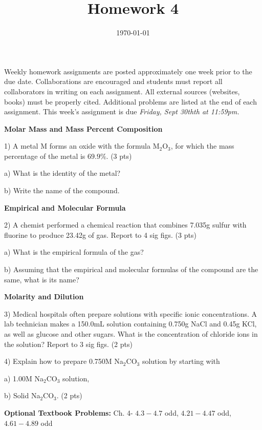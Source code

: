 \documentclass[12pt]{article}
\title{\textbf{Homework 4}}
\date{\vspace{-2em}\today}
\begin{document}
\maketitle 

Weekly homework assignments are posted approximately one week prior to the
due date. Collaborations are encouraged and students must report all collaborators
in writing on each assignment. All external sources (websites, books) must be
properly cited. Additional problems are listed at the end of each assignment.
This week's assignment is due \textit{Friday, Sept 30thth at 11:59pm.}

\textbf{Molar Mass and Mass Percent Composition}

1) A metal M forms an oxide with the formula M$_2$O$_3$, for which the mass
percentage of the metal is $69.9\%$. (3 pts)

a) What is the identity of the metal?

b) Write the name of the compound.

\vspace{1.65in}

\textbf{Empirical and Molecular Formula}

2) A chemist performed a chemical reaction that combines 7.035g sulfur with
fluorine to produce 23.42g of gas. Report to 4 sig figs. (3 pts)

a) What is the empirical formula of the gas?

b) Assuming that the empirical and molecular formulas of the compound are the same,
what is its name?

\newpage

\textbf{Molarity and Dilution}

3) Medical hospitals often prepare solutions with specific ionic concentrations. A
lab technician makes a 150.0mL solution containing 0.750g NaCl and 0.45g KCl, as well
as glucose and other sugars. What is the concentration of chloride ions in the solution?
Report to 3 sig figs. (2 pts)

\vspace{2in}

4) Explain how to prepare 0.750M Na$_2$CO$_3$ solution by starting with

a) 1.00M Na$_2$CO$_3$ solution,

b) Solid Na$_2$CO$_3$. (2 pts)


\vfill

\textbf{Optional Textbook Problems:} Ch. 4- $4.3-4.7$ odd, $4.21-4.47$ odd, $4.61-4.89$ odd
\end{document}
